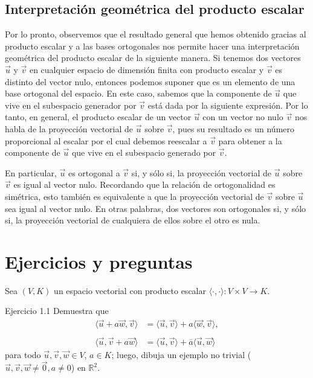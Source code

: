 \documentclass[12pt,dvipsnames]{article}
\numberwithin{equation}{section}
\begin{document}
\subsection{Interpretación geométrica del producto escalar} %

Por lo pronto, observemos que el resultado general que hemos obtenido gracias al producto escalar y a las bases ortogonales nos permite hacer una interpretación geométrica del producto escalar de la siguiente manera. Si tenemos dos vectores $\vec{u}$ y $\vec{v}$ en cualquier espacio de dimensión finita con producto escalar y $\vec{v}$ es distinto del vector nulo, entonces podemos suponer que es un elemento de una base ortogonal del espacio. En este caso, sabemos que la componente de $\vec{u}$ que vive en el subespacio generador por $\vec{v}$ está dada por la siguiente expresión. Por lo tanto, en general, el producto escalar de un vector $\vec{u}$ con un vector no nulo $\vec{v}$ nos habla de la proyección vectorial de $\vec{u}$ sobre $\vec{v}$, pues su resultado es un número proporcional al escalar por el cual debemos reescalar a $\vec{v}$ para obtener a la componente de $\vec{u}$ que vive en el subespacio generado por $\vec{v}$. 

En particular, $\vec{u}$ es ortogonal a $\vec{v}$ si, y sólo si, la proyección vectorial de $\vec{u}$ sobre $\vec{v}$ es igual al vector nulo. Recordando que la relación de ortogonalidad es simétrica, esto también es equivalente a que la proyección vectorial de $\vec{v}$ sobre $\vec{u}$ sea igual al vector nulo. En otras palabras, dos vectores son ortogonales si, y sólo si, la proyección vectorial de cualquiera de ellos sobre el otro es nula.


\section{Ejercicios y preguntas}

\begin{center}
    Sea $(V,K)$ un espacio vectorial con producto escalar $\langle\cdot,\cdot\rangle:V\times V\to K$.
\end{center}

Ejercicio 1.1 Demuestra que %
\begin{align*}
    \langle \vec{u} + a\vec{w}, \vec{v}\rangle &= \langle \vec{u},\vec{v}\rangle + a\langle \vec{w}, \vec{v}\rangle, \\
    \\
    \langle \vec{u}, \vec{v} + a\vec{w}\rangle &= \langle \vec{u},\vec{v}\rangle + \overline{a}\langle \vec{u}, \vec{w}\rangle
\end{align*} para todo $\vec{u},\vec{v},\vec{w}\in V$, $a\in K$; luego, dibuja un ejemplo no trivial ($\vec{u},\vec{v},\vec{w}\neq\vec{0}, a\neq 0$) en $\mathbb{R}^2$. \\
\end{document}

